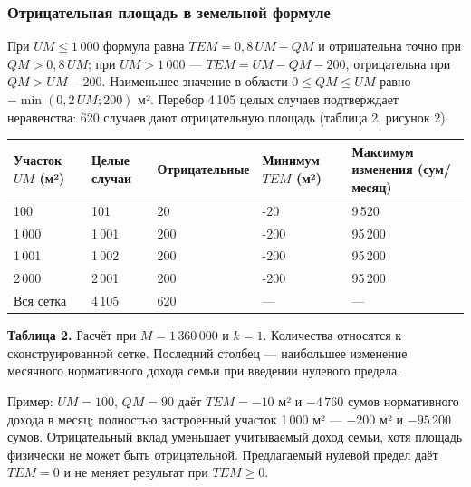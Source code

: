 \documentclass[14pt,a4paper]{extarticle}
\begin{document}
\subsubsection{Отрицательная площадь в земельной формуле}\label{res:land}
При $UM\le1\,000$ формула равна $TEM=0{,}8\,UM-QM$ и отрицательна точно при $QM>0{,}8\,UM$; при $UM>1\,000$ — $TEM=UM-QM-200$, отрицательна при $QM>UM-200$. Наименьшее значение в области $0\le QM\le UM$ равно $-\min(0{,}2\,UM;200)$ м². Перебор 4\,105 целых случаев подтверждает неравенства: 620 случаев дают отрицательную площадь (таблица 2, рисунок 2).

\begingroup\fontsize{11bp}{13.2bp}\selectfont
\begin{longtable}{p{} p{} p{} p{} p{}}
\toprule
Участок $UM$ (м²) & Целые случаи & Отрицательные & Минимум $TEM$ (м²) & Максимум изменения (сум/месяц) \\
\midrule
\endhead
100 & 101 & 20 & -20 & 9\,520 \\
1\,000 & 1\,001 & 200 & -200 & 95\,200 \\
1\,001 & 1\,002 & 200 & -200 & 95\,200 \\
2\,000 & 2\,001 & 200 & -200 & 95\,200 \\
Вся сетка & 4\,105 & 620 & — & — \\
\bottomrule
\end{longtable}
\endgroup
\textbf{Таблица 2.} Расчёт при $M=1\,360\,000$ и $k=1$. Количества относятся к сконструированной сетке. Последний столбец — наибольшее изменение месячного нормативного дохода семьи при введении нулевого предела.

Пример: $UM=100$, $QM=90$ даёт $TEM=-10$ м² и $-4\,760$ сумов нормативного дохода в месяц; полностью застроенный участок 1\,000 м² — $-200$ м² и $-95\,200$ сумов. Отрицательный вклад уменьшает учитываемый доход семьи, хотя площадь физически не может быть отрицательной. Предлагаемый нулевой предел даёт $TEM=0$ и не меняет результат при $TEM\ge0$.
\end{document}
